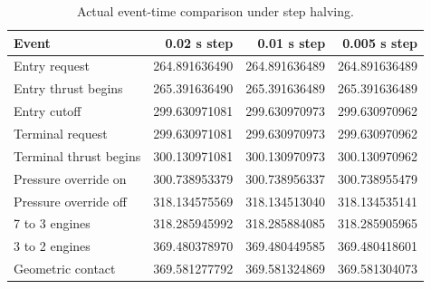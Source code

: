 \begin{table}[htbp]
\centering\small
\caption{Actual event-time comparison under step halving.}
\label{tab:events}
\begin{tabularx}{\linewidth}{@{}Xrrr@{}}
\toprule
Event & 0.02 s step & 0.01 s step & 0.005 s step \\
\midrule
Entry request & 264.891636490 & 264.891636489 & 264.891636489 \\
Entry thrust begins & 265.391636490 & 265.391636489 & 265.391636489 \\
Entry cutoff & 299.630971081 & 299.630970973 & 299.630970962 \\
Terminal request & 299.630971081 & 299.630970973 & 299.630970962 \\
Terminal thrust begins & 300.130971081 & 300.130970973 & 300.130970962 \\
Pressure override on & 300.738953379 & 300.738956337 & 300.738955479 \\
Pressure override off & 318.134575569 & 318.134513040 & 318.134535141 \\
7 to 3 engines & 318.285945992 & 318.285884085 & 318.285905965 \\
3 to 2 engines & 369.480378970 & 369.480449585 & 369.480418601 \\
Geometric contact & 369.581277792 & 369.581324869 & 369.581304073 \\
\bottomrule
\end{tabularx}
\par{}
\end{table}

